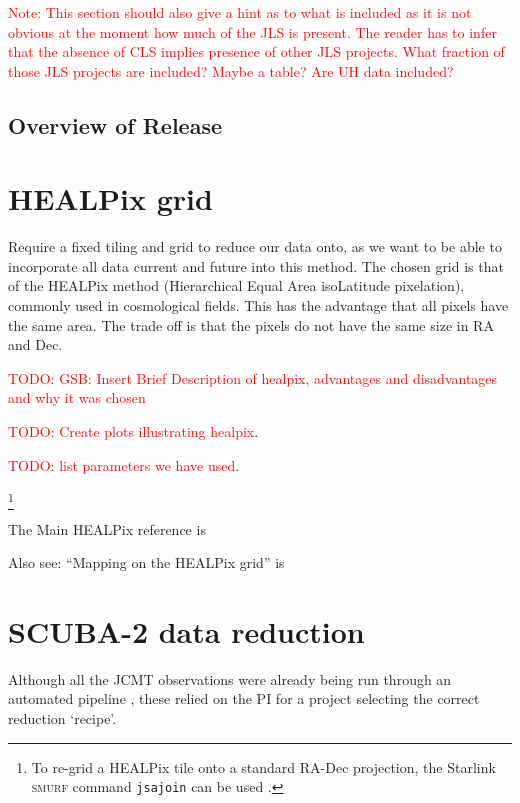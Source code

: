 \documentclass[usenatbib]{mn2e}
\newcommand{\todo}[1]{\textcolor{red}{TODO: #1}}
\newcommand{\note}[1]{\textcolor{red}{Note: #1}}
\begin{document}
\note{This section should also give a hint as to what is included as
  it is not obvious at the moment how much of the JLS is present. The
  reader has to infer that the absence of CLS implies presence of
  other JLS projects. What fraction of those JLS projects are
  included? Maybe a table? Are UH data included?}

\subsection{Overview of Release}







\section{HEALPix grid }
Require a fixed tiling and grid to reduce our data onto, as we want to
be able to incorporate all data current and future into this
method. The chosen grid is that of the HEALPix method (Hierarchical
Equal Area isoLatitude pixelation), commonly used in cosmological
fields. This has the advantage that all pixels have the same area. The
trade off is that the pixels do not have the same size in RA and Dec.

\todo{GSB: Insert Brief Description of healpix, advantages and
  disadvantages and why it was chosen }

\todo{Create plots illustrating healpix}.

\todo{list parameters we have used}.

\footnote{To re-grid a HEALPix tile onto a standard RA-Dec projection,
  the Starlink \textsc{smurf} command \texttt{jsajoin} can be used
  \citep{SUN258}.}

The Main HEALPix reference is \citep{Gorski2005}

Also see: ``Mapping on the HEALPix grid'' is \citep{Calabretta2007}



\section{SCUBA-2 data reduction}
Although all the JCMT observations were already being run through an
automated pipeline \citep{2011scuba2dr,2015oracdr}, these relied on the PI for a
project selecting the correct reduction `recipe'.
\end{document}
